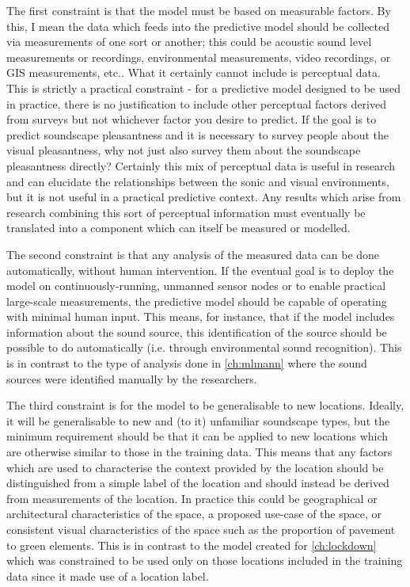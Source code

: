 The first constraint is that the model must be based on measurable factors. By this, I mean the data which feeds into the predictive model should be collected via measurements of one sort or another; this could be acoustic sound level measurements or recordings, environmental measurements, video recordings, or GIS measurements, etc.. What it certainly cannot include is perceptual data. This is strictly a practical constraint - for a predictive model designed to be used in practice, there is no justification to include other perceptual factors derived from surveys but not whichever factor you desire to predict. If the goal is to predict soundscape pleasantness and it is necessary to survey people about the visual pleasantness, why not just also survey them about the soundscape pleasantness directly? Certainly this mix of perceptual data is useful in research and can elucidate the relationships between the sonic and visual environments, but it is not useful in a practical predictive context. Any results which arise from research combining this sort of perceptual information must eventually be translated into a component which can itself be measured or modelled. 

The second constraint is that any analysis of the measured data can be done automatically, without human intervention. If the eventual goal is to deploy the model on continuously-running, unmanned sensor nodes or to enable practical large-scale measurements, the predictive model should be capable of operating with minimal human input. This means, for instance, that if the model includes information about the sound source, this identification of the source should be possible to do automatically (i.e. through environmental sound recognition). This is in contrast to the type of analysis done in \cref{ch:mlmann} where the sound sources were identified manually by the researchers. 

The third constraint is for the model to be generalisable to new locations. Ideally, it will be generalisable to new and (to it) unfamiliar soundscape types, but the minimum requirement should be that it can be applied to new locations which are otherwise similar to those in the training data. This means that any factors which are used to characterise the context provided by the location should be distinguished from a simple label of the location and should instead be derived from measurements of the location. In practice this could be geographical or architectural characteristics of the space, a proposed use-case of the space, or consistent visual characteristics of the space such as the proportion of pavement to green elements. This is in contrast to the model created for \cref{ch:lockdown} which was constrained to be used only on those locations included in the training data since it made use of a location label.

